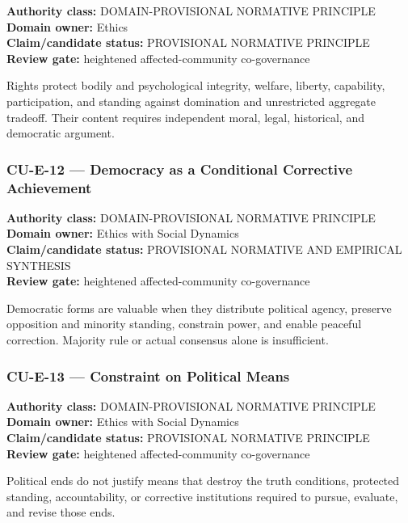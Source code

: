 \documentclass[
  11pt,
]{article}
\begin{document}
\textbf{Authority class:} DOMAIN-PROVISIONAL NORMATIVE PRINCIPLE\\
\textbf{Domain owner:} Ethics\\
\textbf{Claim/candidate status:} PROVISIONAL NORMATIVE PRINCIPLE\\
\textbf{Review gate:} heightened affected-community co-governance

Rights protect bodily and psychological integrity, welfare, liberty,
capability, participation, and standing against domination and
unrestricted aggregate tradeoff. Their content requires independent
moral, legal, historical, and democratic argument.

\subsubsection{CU-E-12 --- Democracy as a Conditional Corrective
Achievement}\label{cu-e-12-democracy-as-a-conditional-corrective-achievement}

\textbf{Authority class:} DOMAIN-PROVISIONAL NORMATIVE PRINCIPLE\\
\textbf{Domain owner:} Ethics with Social Dynamics\\
\textbf{Claim/candidate status:} PROVISIONAL NORMATIVE AND EMPIRICAL
SYNTHESIS\\
\textbf{Review gate:} heightened affected-community co-governance

Democratic forms are valuable when they distribute political agency,
preserve opposition and minority standing, constrain power, and enable
peaceful correction. Majority rule or actual consensus alone is
insufficient.

\subsubsection{CU-E-13 --- Constraint on Political
Means}\label{cu-e-13-constraint-on-political-means}

\textbf{Authority class:} DOMAIN-PROVISIONAL NORMATIVE PRINCIPLE\\
\textbf{Domain owner:} Ethics with Social Dynamics\\
\textbf{Claim/candidate status:} PROVISIONAL NORMATIVE PRINCIPLE\\
\textbf{Review gate:} heightened affected-community co-governance

Political ends do not justify means that destroy the truth conditions,
protected standing, accountability, or corrective institutions required
to pursue, evaluate, and revise those ends.
\end{document}
